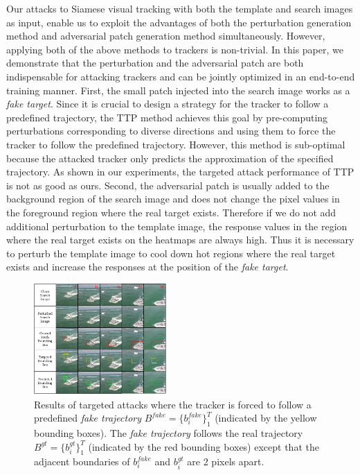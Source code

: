 \documentclass[journal]{IEEEtran}
\renewcommand{\uline}{}
\begin{document}
Our attacks \uline{to} Siamese visual tracking with both the template and search images as input, enable us to exploit the advantages of both the perturbation generation method \cite{FGSM} and adversarial patch generation method \cite{patch} simultaneously. However, applying both of the above methods to trackers is non-trivial. In this paper, we demonstrate that the perturbation and the adversarial patch are both indispensable for attacking trackers and can be jointly optimized in an end-to-end training manner. First, the small patch injected into the search image works as a \textit{fake target}. Since it is crucial to design a strategy for the tracker to follow a predefined trajectory, the TTP method \cite{TTP} achieves this goal by pre-computing perturbations corresponding to diverse directions and using them to force the tracker to follow the predefined trajectory. However, this method is sub-optimal because the attacked tracker only predicts the approximation of the specified trajectory. As shown in our experiments, the targeted attack performance of TTP is not as good as ours. Second, the adversarial patch is usually added to the background region of the search image and does not change the pixel values in the foreground region where the real target exists. Therefore if we do not add additional perturbation to the template image, the response values \uline{in} the region where the real target exists on the heatmaps are always high. Thus it is necessary to perturb the template image to \uline{cool} down hot regions where the real target exists and \uline{increase} the responses at the position of the \textit{fake target}.
\vspace{-3mm}

\begin{figure}[t]
  \centering
  \includegraphics[width=0.45\textwidth]{images_imperceptible/vis_v7.pdf}
  \caption{Results of targeted attacks where the tracker is forced to follow a predefined \textit{fake trajectory} $B^{fake}=\{b^{fake}_i\}_1^{T}$ (indicated by the yellow bounding boxes). The \textit{fake trajectory} follows the real trajectory $B^{gt}=\{b^{gt}_i\}_1^T$ (indicated by the red bounding boxes) except that the adjacent boundaries of $b^{fake}_i$ and $b^{gt}_i$ are 2 pixels apart.}
  \label{fig:vis1}
  \vspace{-3mm}
\end{figure}
\end{document}
